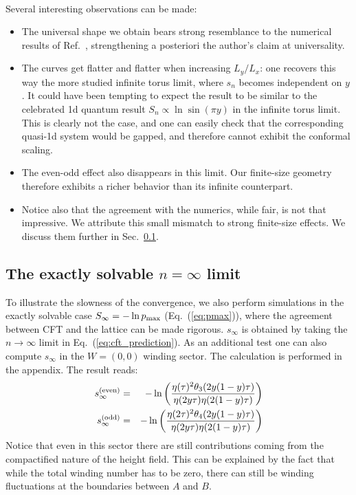 \documentclass[11pt]{iopart}
\begin{document}
\paragraph{}
Several interesting observations can be made:
\begin{itemize}
 \item The universal shape we obtain bears strong resemblance to the numerical results of Ref.~\cite{Ju2012}, strengthening a posteriori the author's claim at universality.  
 \item The curves get flatter and flatter when increasing $L_y/L_x$: one recovers this way the more studied infinite torus limit, where $s_n$ becomes independent on $y$. It could have been tempting to expect the result to be similar to the celebrated 1d quantum result\cite{Cardy} $S_n\propto \ln\sin (\pi y)$ in the infinite torus limit. This is clearly not the case, and one can easily check that the corresponding quasi-1d system would be gapped, and therefore cannot exhibit the conformal scaling. 
 \item The even-odd effect also disappears in this limit. Our finite-size geometry therefore exhibits a richer behavior than its infinite counterpart.
 \item Notice also that the agreement with the numerics, while fair, is not that impressive. We attribute this small mismatch to strong finite-size effects. We discuss them further in Sec.~\ref{sec:exact}.
\end{itemize}
\subsection{The exactly solvable $n=\infty$ limit}
\label{sec:exact}
To illustrate the slowness of the convergence, we also perform simulations in the exactly solvable case $S_\infty=-\ln p_{\rm max}$ (Eq.~(\ref{eq:pmax})), where the agreement between CFT and the lattice can be made rigorous. $s_{\infty}$ is obtained by taking the $n\to \infty$ limit in Eq.~(\ref{eq:cft_prediction}). 
As an additional test one can also compute $s_\infty$ in the $W=(0,0)$ winding sector. The calculation is performed in the appendix. The result reads:
\begin{eqnarray}\label{eq:cft_w0}
 s_\infty^{\rm (even)}&=&-\ln \left(\frac{\eta(\tau)^2\theta_3(2y(1-y)\tau)}{\eta(2y\tau)\eta(2(1-y)\tau)}\right)\\
 s_\infty^{\rm (odd)}&=&-\ln \left(\frac{\eta(2\tau)^2\theta_4(2y(1-y)\tau)}{\eta(2y\tau)\eta(2(1-y)\tau)}\right)
\end{eqnarray}
Notice that even in this sector there are still contributions coming from the compactified nature of the height field. This can be explained by the fact that while the total winding number has to be zero, there can still be winding fluctuations at the boundaries between $A$ and $B$. 
\end{document}

